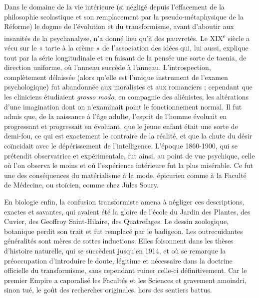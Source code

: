 \documentclass[french,twoside]{book} %
\begin{document}
Dans le domaine de la vie intérieure (si négligé depuis l’effacement de la philosophie scolastique et son remplacement par la pseudo-métaphysique de la Réforme) le dogme de l’évolution et du transformisme, avant d’aboutir aux insanités de la psychanalyse, n’a donné lieu qu’à des pauvretés. Le XIX\textsuperscript{e} siècle a vécu sur le « tarte à la crème » de l’association des idées qui, lui aussi, explique tout par la série longitudinale et en faisant de la pensée une sorte de taenia, de direction uniforme, où l’anneau succède à l’anneau. L’introspection, complètement délaissée (alors qu’elle est l’unique instrument de l’examen psychologique) fut abandonnée aux moralistes et aux romanciers ; cependant que les cliniciens étudiaient {\itshape grosso modo}, en compagnie des aliénistes, les altérations d’une imagination dont on n’examinait point le fonctionnement normal. Il fut admis que, de la naissance à l’âge adulte, l’esprit de l’homme évoluait en progressant et progressait en évoluant, que le jeune enfant était une sorte de demi-fou, ce qui est exactement le contraire de la réalité, et que la chute du désir coïncidait avec le dépérissement de l’intelligence. L’époque 1860-1900, qui se prétendit observatrice et expérimentale, fut ainsi, au point de vue psychique, celle où l’on observa le moins et où l’expérience intérieure fut la plus misérable. Ce fut une des conséquences du matérialisme à la mode, épicurien comme à la Faculté de Médecine, ou stoïcien, comme chez Jules Soury.\par
En biologie enfin, la confusion transformiste amena à négliger ces descriptions, exactes et savantes, qui avaient été la gloire de l’école du Jardin des Plantes, des Cuvier, des Geoffroy Saint-Hilaire, des Quatrefages. Le dessin zoologique, botanique perdit son trait et fut remplacé par le badigeon. Les outrecuidantes généralités sont mères de sottes inductions. Elles foisonnent dans les thèses d’histoire naturelle, qui se succèdent jusqu’en 1914, et où se remarque la préoccupation d’introduire le doute, légitime et nécessaire dans la doctrine officielle du transformisme, sans cependant ruiner celle-ci définitivement. Car le premier Empire a caporalisé les Facultés et les Sciences et gravement amoindri, sinon tué, le goût des recherches originales, hors des sentiers battus.\par
\end{document}
